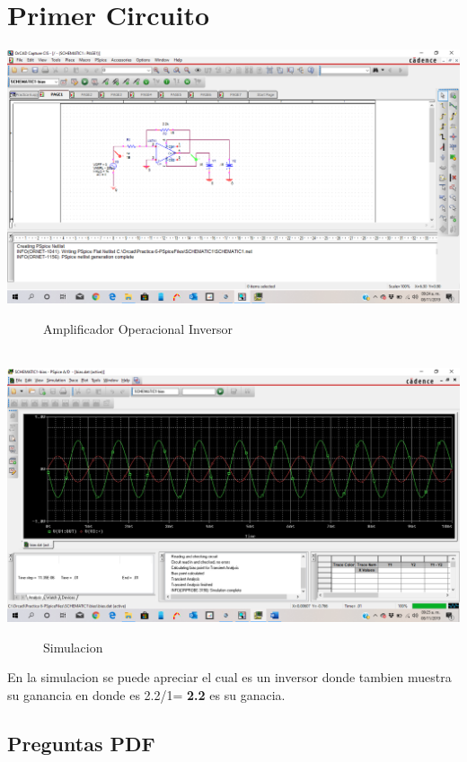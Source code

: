 \documentclass[10pt,a4paper]{article}
\begin{document}
\section{Primer Circuito}
\begin{center}
 \includegraphics[scale=0.3]{1.png}
 \begin{figure}[hbtp]
 \caption{Amplificador Operacional Inversor}
 \centering
 \end{figure}\\
  \includegraphics[scale=0.3]{2.png}
 \begin{figure}[hbtp]
 \caption{Simulacion}
 \centering
 \end{figure} 
\end{center}

En la simulacion se puede apreciar el cual es un inversor donde tambien muestra su ganancia en donde es 2.2/1= \textbf{2.2} es su ganacia.

\subsection{Preguntas PDF}
\end{document}
